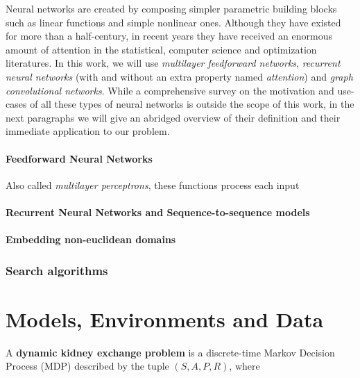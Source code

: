 \documentclass[12pt]{article}
\begin{document}
Neural networks are created by composing simpler parametric building blocks such as linear functions and simple nonlinear ones\cite{goodfellow2016deep}. Although they have existed for more than a half-century, in recent years they have received an enormous amount of attention in the statistical, computer science and optimization literatures. In this work, we will use \emph{multilayer feedforward networks}, \emph{recurrent neural networks} (with and without an extra property named \emph{attention}) and \emph{graph convolutional networks}. While a comprehensive survey on the motivation and use-cases of all these types of neural networks is outside the scope of this work, in the next paragraphs we will give an abridged overview of their definition and their immediate application to our problem. 

\paragraph{Feedforward Neural Networks} Also called \emph{multilayer perceptrons}, these functions process each input



\paragraph{Recurrent Neural Networks and Sequence-to-sequence models}
\paragraph{Embedding non-euclidean domains} \label{par:embedding}
\subsubsection{Search algorithms}



\section{Models, Environments and Data} \label{sec:data}

A \textbf{dynamic kidney exchange problem} is a discrete-time Markov Decision Process (MDP) described by the tuple $(S, A, P, R)$, where
\end{document}
